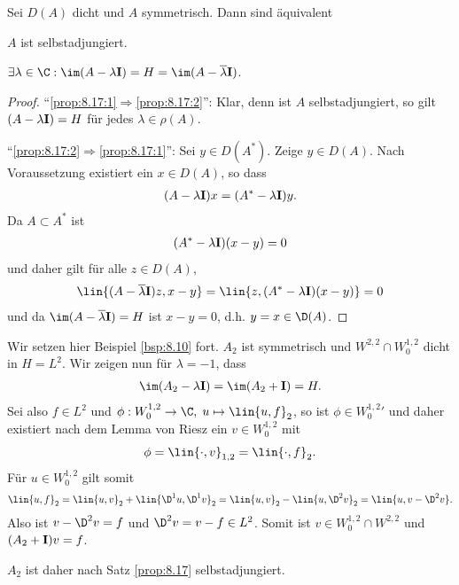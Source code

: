 \begin{prop}
\label{prop:8.17}
Sei $D(A)$ dicht und $A$ symmetrisch. Dann sind äquivalent
\begin{equivenum}
\item\label{prop:8.17:1} $A$ ist selbstadjungiert.
\item\label{prop:8.17:2} $\exists \lambda\in \C : \im(A-\lambda\Id) = H =
\im(A-\overline{\lambda}\Id)$.\fishhere
\end{equivenum}
\end{prop}
\begin{proof}
``\ref{prop:8.17:1}$\Rightarrow$\ref{prop:8.17:2}'': Klar, denn ist $A$
selbstadjungiert, so gilt $(A-\lambda\mathbf{I})=H$ für jedes $\lambda\in\rho(A)$.

``\ref{prop:8.17:2}$\Rightarrow$\ref{prop:8.17:1}'': Sei $y\in D(A^*)$. Zeige
$y\in D(A)$. Nach Voraussetzung existiert ein $x\in D(A)$, so dass
\begin{align*}
(A-\lambda\mathbf{I})x = (A^*-\lambda\mathbf{I})y.
\end{align*}
Da $A\subset A^*$ ist
\begin{align*}
(A^*-\lambda\mathbf{I})(x-y) = 0
\end{align*}
und daher gilt für alle $z\in D(A)$,
\begin{align*}
\lin{(A-\overline{\lambda}\Id)z,x-y} = 
\lin{z,(A^*-\lambda\Id)(x-y)} = 0 
\end{align*}
und da $\im(A-\overline{\lambda}\Id)=H$ ist $x-y=0$, d.h. $y=x\in\D(A)$.\qedhere
\end{proof}

\begin{bsp}
\label{bsp:8.18}
Wir setzen hier Beispiel \ref{bsp:8.10} fort. $A_2$ ist symmetrisch und
$W^{2,2}\cap W^{1,2}_0$ dicht in $H=L^2$. Wir zeigen nun für $\lambda=-1$, dass
\begin{align*}
\im(A_2-\lambda\Id) = \im(A_2+\Id) = H.
\end{align*}
Sei also $f\in L^2$ und $\phi: W_0^{1,2}\to\C,\; u\mapsto \lin{u,f}_2$, so ist
$\phi\in {W_0^{1,2}}'$ und daher existiert nach dem Lemma von Riesz ein $v\in
W_0^{1,2}$ mit
\begin{align*}
\phi = \lin{\cdot,v}_{1,2} = \lin{\cdot,f}_2.
\end{align*}
Für $u\in W_0^{1,2}$ gilt somit
\begin{align*}
\lin{u,f}_2 = \lin{u,v}_2 + \lin{\D^1 u,\D^1 v}_2
= \lin{u,v}_2 - \lin{u,\D^2 v}_2= \lin{u,v-\D^2 v}.
\end{align*}
Also ist $v-\D^2 v = f$ und 
$\D^2 v = v-f\in L^2$. Somit ist $v\in W_0^{1,2}\cap W^{2,2}$ und $(A_2+\mathbf{I})v =
f$.

$A_2$ ist daher nach Satz \ref{prop:8.17} selbstadjungiert.\bsphere
\end{bsp}
